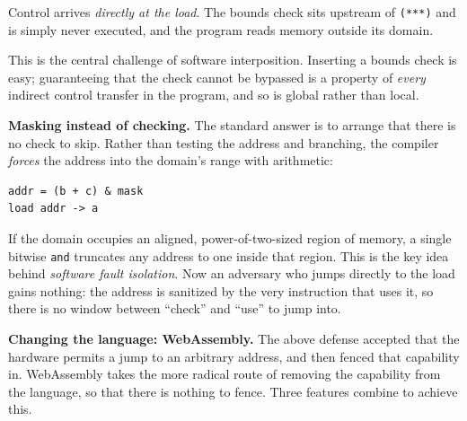 \documentclass[
  letterpaper,
]{scrbook}
\theoremstyle{definition}
\theoremstyle{plain}
\theoremstyle{plain}
\theoremstyle{remark}
\begin{document}
Control arrives \emph{directly at the load}. The bounds check sits
upstream of \texttt{(***)} and is simply never executed, and the program
reads memory outside its domain.


This is the central challenge of software interposition. Inserting a
bounds check is easy; guaranteeing that the check cannot be bypassed is
a property of \emph{every} indirect control transfer in the program, and
so is global rather than local.

\textbf{Masking instead of checking.} The standard answer is to arrange
that there is no check to skip. Rather than testing the address and
branching, the compiler \emph{forces} the address into the domain's
range with arithmetic:

\begin{verbatim}
addr = (b + c) & mask
load addr -> a
\end{verbatim}

If the domain occupies an aligned, power-of-two-sized region of memory,
a single bitwise \texttt{and} truncates any address to one inside that
region. This is the key idea behind \emph{software fault isolation}. Now
an adversary who jumps directly to the load gains nothing: the address
is sanitized by the very instruction that uses it, so there is no window
between ``check'' and ``use'' to jump into.


\textbf{Changing the language: WebAssembly.} The above defense accepted
that the hardware permits a jump to an arbitrary address, and then
fenced that capability in. WebAssembly takes the more radical route of
removing the capability from the language, so that there is nothing to
fence. Three features combine to achieve this.
\end{document}
